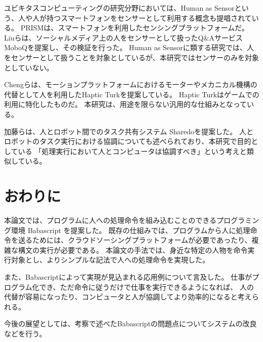 \documentclass[twoside]{wiss}
\begin{document}
ユビキタスコンピューティングの研究分野においては、Human as Sensorという、人や人が持つスマートフォンをセンサーとして利用する概念も提唱されている。
PRISMは、スマートフォンを利用したセンシングプラットフォームだ\cite{prism}。
Liuらは、ソーシャルメディア上の人をセンサーとして扱ったQ\&AサービスMoboQを提案し、その検証を行った。
Human as Sensorに類する研究では、人をセンサーとして扱うことを対象としているが、本研究ではセンサーのみを対象としていない。

Chengらは、モーションプラットフォームにおけるモーターやメカニカル機構の代替として人を利用したHaptic Turkを提案している\cite{hapticturk}。
Haptic Turkはゲームでの利用に特化したものだ。
本研究は、用途を限らない汎用的な仕組みとなっている。

加藤らは、人とロボット間でのタスク共有システム Sharedoを提案した\cite{sharedo}。
人とロボットのタスク実行における協調についても述べられており、本研究で目的としている
「処理実行において人とコンピュータは協調すべき」という考えと類似している。


\section{おわりに}

本論文では、プログラムに人への処理命令を組み込むことのできるプログラミング環境 Babascript を提案した。
既存の仕組みでは、プログラムから人に処理命令を送るためには、クラウドソーシングプラットフォームが必要であったり、複雑な構文の実行が必要である。
本論文の手法では、身近な特定の人物を命令実行対象とし、よりシンプルな記法で人への処理命令を実現した。

また、Babascriptによって実現が見込まれる応用例について言及した。
仕事がプログラム化でき、ただ命令に従うだけで仕事を実行できるようになれば、
人の代替が容易になったり、コンピュータと人が協調してより効率的になると考えられる。

今後の展望としては、考察で述べたBabascriptの問題点についてシステムの改良などを行う。

{\scriptsize


}
\end{document}
